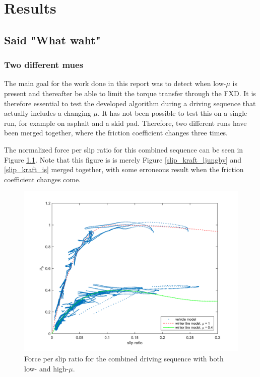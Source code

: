 \chapter{Results}

\section{Said "What waht"}

\subsection{Two different mues}
The main goal for the work done in this report was to detect when low-$ \mu $ is present and thereafter be able to limit the torque transfer through the FXD. It is therefore essential to test the developed algorithm during a driving sequence that actually includes a changing $ \mu $. It has not been possible to test this on a single run, for example on asphalt and a skid pad. Therefore, two different runs have been merged together, where the friction coefficient changes three times.

The normalized force per slip ratio for this combined sequence can be seen in Figure \ref{slip_kraft_comb2}. Note that this figure is is merely Figure \ref{slip_kraft_ljungby} and \ref{slip_kraft_is} merged together, with some erroneous result when the friction coefficient changes come. 

\begin{figure}[h]
	\centering
	\includegraphics[width=1.0\textwidth]{Pictures/slip_kraft_comb2}
	\caption {Force per slip ratio for the combined driving sequence with both low- and high-$ \mu $.}
	\label{slip_kraft_comb2}
\end{figure}
